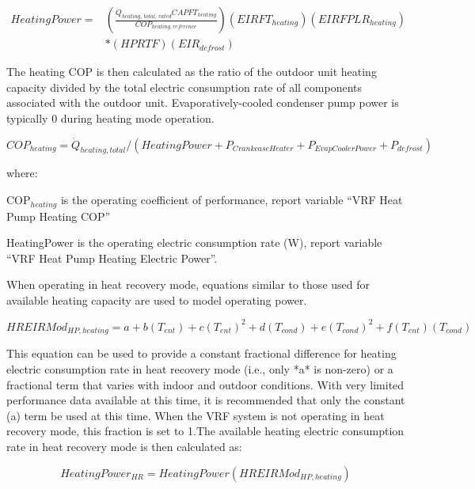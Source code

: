 \begin{equation}
\begin{array}{rl}
  HeatingPower =& \left( \frac{\dot{Q}_{heating,\,total,\,rated} CAPFT_{heating}}{COP_{heating,reference}} \right) \left( EIRFT_{heating} \right) \left( EIRFPLR_{heating} \right) \\
  & * \left( HPRTF \right) \left( EIR_{defrost} \right)
\end{array}
\end{equation}

The heating COP is then calculated as the ratio of the outdoor unit heating capacity divided by the total electric consumption rate of all components associated with the outdoor unit. Evaporatively-cooled condenser pump power is typically 0 during heating mode operation.

\begin{equation}
  COP_{heating} = \dot{Q}_{heating,total} / \left( HeatingPower + P_{CrankcaseHeater} + P_{EvapCoolerPower} + P_{defrost} \right)
\end{equation}

where:

COP\(_{heating}\) is the operating coefficient of performance, report variable ``VRF Heat Pump Heating COP''

HeatingPower is the operating electric consumption rate (W), report variable ``VRF Heat Pump Heating Electric Power''.

When operating in heat recovery mode, equations similar to those used for available heating capacity are used to model operating power.

\begin{equation}
  HREIRMod_{HP,heating} = a + b \left( T_{ent} \right) + c \left( T_{ent} \right)^2 + d \left( T_{cond} \right) + e \left( T_{cond} \right)^2 + f \left( T_{ent} \right) \left( T_{cond} \right)
\end{equation}

This equation can be used to provide a constant fractional difference for heating electric consumption rate in heat recovery mode (i.e., only *a* is non-zero) or a fractional term that varies with indoor and outdoor conditions. With very limited performance data available at this time, it is recommended that only the constant (a) term be used at this time. When the VRF system is not operating in heat recovery mode, this fraction is set to 1.The available heating electric consumption rate in heat recovery mode is then calculated as:

\begin{equation}
  HeatingPower_{HR} = HeatingPower \left( HREIRMod_{HP,heating} \right)
\end{equation}

